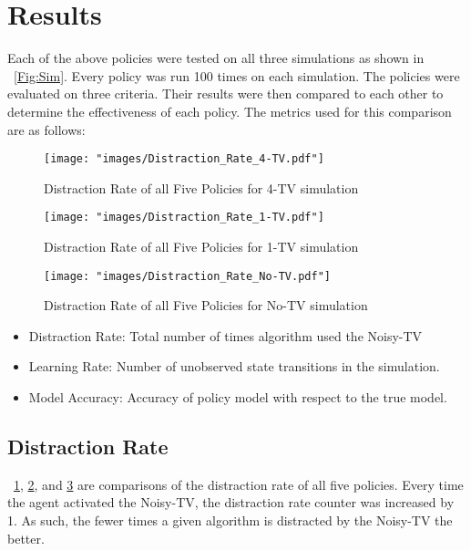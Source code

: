 \documentclass[letterpaper]{article} %
\begin{document}
\section{Results}
Each of the above policies were tested on all three simulations as shown in \figurename~\ref{Fig:Sim}. Every policy was run 100 times on each simulation. The policies were evaluated on three criteria. Their results were then compared to each other to determine the effectiveness of each policy. The metrics used for this comparison are as follows:
\begin{figure}
	\begin{center}
		\texttt{[image: "images/Distraction\_Rate\_4-TV.pdf"]}
	\end{center}
	\caption{Distraction Rate of all Five Policies for 4-TV simulation}
	\label{Fig:DRFP4TV}
\end{figure}
\begin{figure}
	\begin{center}
		\texttt{[image: "images/Distraction\_Rate\_1-TV.pdf"]}
	\end{center}
	\caption{Distraction Rate of all Five Policies for 1-TV simulation}
	\label{Fig:DRFP1TV}
\end{figure}
\begin{figure}
	\begin{center}
		\texttt{[image: "images/Distraction\_Rate\_No-TV.pdf"]}
	\end{center}
	\caption{Distraction Rate of all Five Policies for No-TV simulation}
	\label{Fig:DRFP0TV}
\end{figure}

\begin{itemize}
	\item Distraction Rate: Total number of times algorithm used the Noisy-TV
	\item Learning Rate: Number of unobserved state transitions in the simulation.
	\item Model Accuracy: Accuracy of policy model with respect to the true model.
\end{itemize}

\subsection{Distraction Rate}
\figurename~\ref{Fig:DRFP4TV}, \ref{Fig:DRFP1TV}, and \ref{Fig:DRFP0TV} are comparisons of the distraction rate of all five policies. Every time the agent activated the Noisy-TV, the distraction rate counter was increased by 1. As such, the fewer times a given algorithm is distracted by the Noisy-TV the better.
\end{document}

